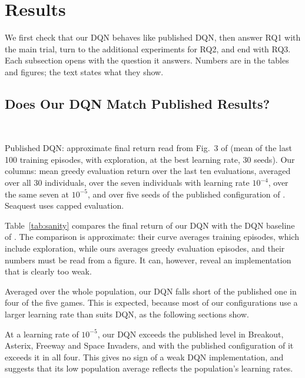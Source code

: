\documentclass[conference,a4paper]{IEEEtran}
\newcommand{\fresults}{../analysis_output/followup-02/report}
\begin{document}
\section{Results}\label{sec:results}

We first check that our DQN behaves like published DQN, then answer RQ1 with the main trial, turn to the additional
experiments for RQ2, and end with RQ3. Each subsection opens with the question it answers. Numbers are in the tables and
figures; the text states what they show.

\subsection{Does Our DQN Match Published Results?}\label{sec:sanity}

\begin{table}[t]
\caption{Final Return of DQN Compared with the Published MinAtar DQN}
\label{tab:sanity}
\centering
\footnotesize
\setlength{\tabcolsep}{4pt}
\\[3pt]
\parbox{\columnwidth}{\scriptsize Published DQN: approximate final return read from Fig.~3 of \citet{young2019minatar}
(mean of the last 100 training episodes, with exploration, at the best learning rate, 30 seeds). Our columns: mean
greedy evaluation return over the last ten evaluations, averaged over all 30 individuals, over the seven individuals
with learning rate $10^{-4}$, over the same seven at $10^{-5}$, and over five seeds of the published configuration of
\citet{obandoceron2021revisiting}. Seaquest uses capped evaluation.}
\end{table}

Table~\ref{tab:sanity} compares the final return of our DQN with the DQN baseline of \citet{young2019minatar}. The
comparison is approximate: their curve averages training episodes, which include exploration, while ours averages greedy
evaluation episodes, and their numbers must be read from a figure. It can, however, reveal an implementation that is
clearly too weak.

Averaged over the whole population, our DQN falls short of the published one in four of the five games. This is
expected, because most of our configurations use a larger learning rate than suits DQN, as the following sections show.

At a learning rate of $10^{-5}$, our DQN exceeds the published level in Breakout, Asterix, Freeway and Space
Invaders, and with the published configuration of \citet{obandoceron2021revisiting} it exceeds it in all four. This
gives no sign of a weak DQN implementation, and suggests that its low population average reflects the population's
learning rates.
\end{document}
